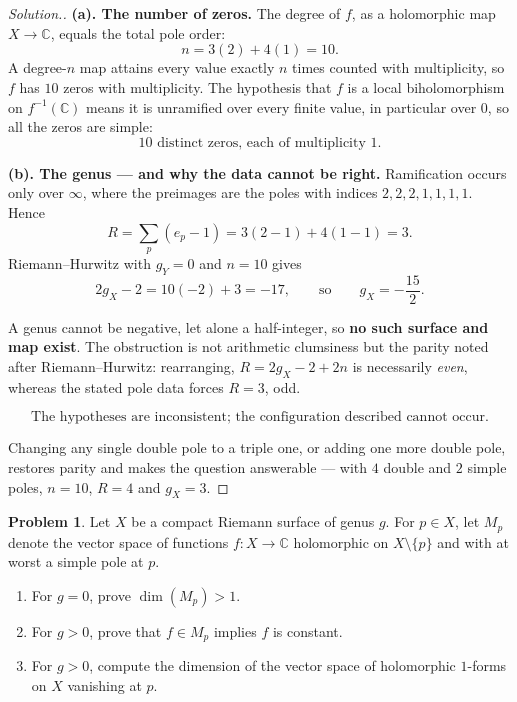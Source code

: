 \documentclass[11pt,a4paper]{article}
\theoremstyle{definition}
\newtheorem{problemx}{Problem}[section]
\newenvironment{problem}{\begin{problemx}}{\end{problemx}}
\newenvironment{solution}
  {\renewcommand{\qedsymbol}{}\begin{proof}[\textit{Solution}.]}
  {\end{proof}}
\begin{document}
\begin{solution}
\textbf{(a). The number of zeros.} The degree of $f$, as a holomorphic map
$X \rightarrow \widehat{\mathbb{C}}$, equals the total pole order:
$$n = 3(2) + 4(1) = 10 .$$
A degree-$n$ map attains every value exactly $n$ times counted with multiplicity,
so $f$ has $10$ zeros with multiplicity. The hypothesis that $f$ is a local
biholomorphism on $f^{-1}(\mathbb{C})$ means it is unramified over every finite
value, in particular over $0$, so all the zeros are simple:
$$\boxed{10 \text{ distinct zeros, each of multiplicity } 1 .}$$

\textbf{(b). The genus --- and why the data cannot be right.} Ramification occurs
only over $\infty$, where the preimages are the poles with indices
$2,2,2,1,1,1,1$. Hence
$$R = \sum_{p}(e_p-1) = 3(2-1) + 4(1-1) = 3 .$$
Riemann--Hurwitz with $g_Y = 0$ and $n = 10$ gives
$$2g_X - 2 = 10(-2) + 3 = -17,
\qquad\text{so}\qquad g_X = -\frac{15}{2}.$$

A genus cannot be negative, let alone a half-integer, so \textbf{no such surface
and map exist}. The obstruction is not arithmetic clumsiness but the parity noted
after Riemann--Hurwitz: rearranging, $R = 2g_X - 2 + 2n$ is necessarily
\emph{even}, whereas the stated pole data forces $R = 3$, odd.

$$\boxed{\text{The hypotheses are inconsistent; the configuration described cannot
occur.}}$$

Changing any single double pole to a triple one, or adding one more double pole,
restores parity and makes the question answerable --- with $4$ double and $2$ simple
poles, $n = 10$, $R = 4$ and $g_X = 3$.
\end{solution}


\begin{problem}
Let $X$ be a compact Riemann surface of genus $g$. For $p \in X$, let $M_p$
denote the vector space of functions $f : X \rightarrow \mathbb{C}$ holomorphic
on $X\setminus\{p\}$ and with at worst a simple pole at $p$.
\begin{enumerate}
\item[(a).] For $g = 0$, prove $\dim(M_p) > 1$.
\item[(b).] For $g > 0$, prove that $f \in M_p$ implies $f$ is constant.
\item[(c).] For $g > 0$, compute the dimension of the vector space of holomorphic
$1$-forms on $X$ vanishing at $p$.
\end{enumerate}
\end{problem}
\end{document}
